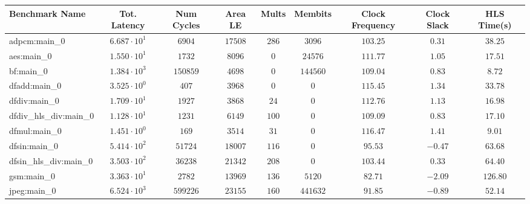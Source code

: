 \begin{tabular}{|l|c|c|c|c|c|c|c|c|}
\hline
Benchmark Name          & Tot. Latency           & Num Cycles & Area LE    & Mults    & Membits    & Clock Frequency & Clock Slack & HLS Time(s) \\
\hline
adpcm:main\_0           & $ 6.687 \cdot 10^{1} $ & $ 6904   $ & $ 17508  $ & $ 286  $ & $ 3096   $ & $ 103.25      $ & $ 0.31    $ & $ 38.25   $ \\
aes:main\_0             & $ 1.550 \cdot 10^{1} $ & $ 1732   $ & $ 8096   $ & $ 0    $ & $ 24576  $ & $ 111.77      $ & $ 1.05    $ & $ 17.51   $ \\
bf:main\_0              & $ 1.384 \cdot 10^{3} $ & $ 150859 $ & $ 4698   $ & $ 0    $ & $ 144560 $ & $ 109.04      $ & $ 0.83    $ & $ 8.72    $ \\
dfadd:main\_0           & $ 3.525 \cdot 10^{0} $ & $ 407    $ & $ 3968   $ & $ 0    $ & $ 0      $ & $ 115.45      $ & $ 1.34    $ & $ 33.78   $ \\
dfdiv:main\_0           & $ 1.709 \cdot 10^{1} $ & $ 1927   $ & $ 3868   $ & $ 24   $ & $ 0      $ & $ 112.76      $ & $ 1.13    $ & $ 16.98   $ \\
dfdiv\_hls\_div:main\_0 & $ 1.128 \cdot 10^{1} $ & $ 1231   $ & $ 6149   $ & $ 100  $ & $ 0      $ & $ 109.09      $ & $ 0.83    $ & $ 17.10   $ \\
dfmul:main\_0           & $ 1.451 \cdot 10^{0} $ & $ 169    $ & $ 3514   $ & $ 31   $ & $ 0      $ & $ 116.47      $ & $ 1.41    $ & $ 9.01    $ \\
dfsin:main\_0           & $ 5.414 \cdot 10^{2} $ & $ 51724  $ & $ 18007  $ & $ 116  $ & $ 0      $ & $ 95.53       $ & $ -0.47   $ & $ 63.68   $ \\
dfsin\_hls\_div:main\_0 & $ 3.503 \cdot 10^{2} $ & $ 36238  $ & $ 21342  $ & $ 208  $ & $ 0      $ & $ 103.44      $ & $ 0.33    $ & $ 64.40   $ \\
gsm:main\_0             & $ 3.363 \cdot 10^{1} $ & $ 2782   $ & $ 13969  $ & $ 136  $ & $ 5120   $ & $ 82.71       $ & $ -2.09   $ & $ 126.80  $ \\
jpeg:main\_0            & $ 6.524 \cdot 10^{3} $ & $ 599226 $ & $ 23155  $ & $ 160  $ & $ 441632 $ & $ 91.85       $ & $ -0.89   $ & $ 52.14   $ \\

\end{tabular}

